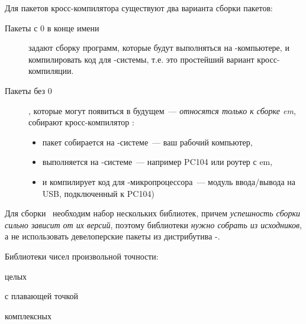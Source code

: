 



\secdown

Для пакетов кросс-компилятора существуют два варианта сборки пакетов:

\begin{description}

\item[Пакеты с 0 в конце имени] задают сборку программ, которые будут
выполняться на -компьютере, и компилировать код для -системы, т.е. это
простейший вариант кросс-компиляции.

\item[Пакеты без 0], которые могут появиться в будущем\ --- \emph{относятся
только к сборке em\linux}, собирают кросс-компилятор :

\begin{itemize}[nosep]
\item пакет собирается на -системе\ --- ваш рабочий компьютер,
\item выполняется на -системе\ --- например PC104 или роутер с
em\linux,
\item и компилирует код для -микропроцессора\ --- модуль
ввода/вывода на USB, подключенный к PC104)
\end{itemize}
 
\end{description}


Для сборки \gnut\ необходим набор нескольких библиотек, причем \emph{успешность
сборки сильно зависит от их версий}, поэтому библиотеки \emph{нужно собрать из
исходников}, а не использовать девелоперские пакеты из дистрибутива
-\linux.

\bigskip\noindent
Библиотеки чисел произвольной точности:
\begin{description}[nosep]
\item[\prog{gmp0}] целых 
\item[\prog{gmfr0}] с плавающей точкой
\item[\prog{gmc0}] комплексных
\end{description}

